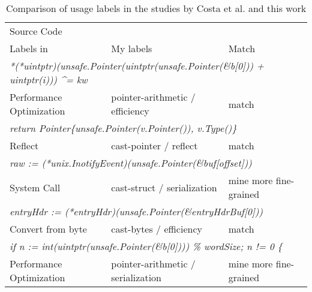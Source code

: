 \begin{table}[h]
    \centering
    \caption{Comparison of \unsafe{} usage labels in the studies by Costa et al. and this work}
    \label{tbl:costa-labels-comparison}
    \begin{tabularx}{\textwidth}{X|l|l}
        \toprule
        \multicolumn{3}{l}{Source Code} \\
        Labels in~\cite{costa2020} & My labels                           & Match \\
        \midrule
        \multicolumn{3}{l}{\textit{*(*uintptr)(unsafe.Pointer(uintptr(unsafe.Pointer(\&b[0])) + uintptr(i))) \^{}= kw}} \\
        Performance Optimization   & pointer-arithmetic / efficiency     & match  \\ \hline
        \multicolumn{3}{l}{\textit{return Pointer\{unsafe.Pointer(v.Pointer()), v.Type()\}}} \\
        Reflect                    & cast-pointer / reflect              & match  \\ \hline
        \multicolumn{3}{l}{\textit{raw := (*unix.InotifyEvent)(unsafe.Pointer(\&buf[offset]))}} \\
        System Call                & cast-struct / serialization         & mine more fine-grained \\ \hline
        \multicolumn{3}{l}{\textit{entryHdr := (*entryHdr)(unsafe.Pointer(\&entryHdrBuf[0]))}} \\
        Convert from byte          & cast-bytes / efficiency             & match  \\ \hline
        \multicolumn{3}{l}{\textit{if n := int(uintptr(unsafe.Pointer(\&b[0]))) \% wordSize; n != 0 \{}} \\
        Performance Optimization   & pointer-arithmetic / serialization  & mine more fine-grained \\
        \bottomrule
    \end{tabularx}
\end{table}